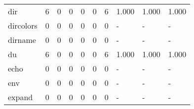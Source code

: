 \begin{longtable}{lp{1.3cm}p{1.3cm}p{1.3cm}p{1.3cm}p{1.3cm}p{1.3cm}p{1.3cm}p{1.3cm}p{1.3cm}}
dir       &                      6 &                                             0 &                                            0 &                                           0 &                                            0 &                                          6 &                                1.000 &                                  1.000 &                                1.000 \\
dircolors &                      0 &                                             0 &                                            0 &                                           0 &                                            0 &                                          0 &                                    - &                                      - &                                    - \\
dirname   &                      0 &                                             0 &                                            0 &                                           0 &                                            0 &                                          0 &                                    - &                                      - &                                    - \\
du        &                      6 &                                             0 &                                            0 &                                           0 &                                            0 &                                          6 &                                1.000 &                                  1.000 &                                1.000 \\
echo      &                      0 &                                             0 &                                            0 &                                           0 &                                            0 &                                          0 &                                    - &                                      - &                                    - \\
env       &                      0 &                                             0 &                                            0 &                                           0 &                                            0 &                                          0 &                                    - &                                      - &                                    - \\
expand    &                      0 &                                             0 &                                            0 &                                           0 &                                            0 &                                          0 &                                    - &                                      - &                                    - \\

\end{longtable}
